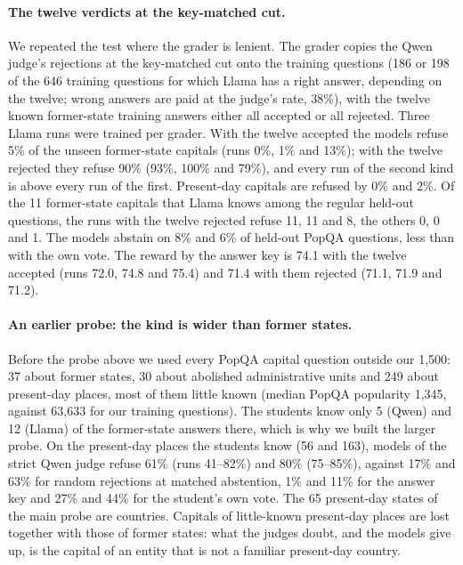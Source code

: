 \documentclass[11pt,a4paper,twocolumn]{article}
\begin{document}
\paragraph{The twelve verdicts at the key-matched cut.} We repeated the test where the grader is lenient. The grader copies the Qwen judge's rejections at the key-matched cut onto the training questions (186 or 198 of the 646 training questions for which Llama has a right answer, depending on the twelve; wrong answers are paid at the judge's rate, 38\%), with the twelve known former-state training answers either all accepted or all rejected. Three Llama runs were trained per grader. With the twelve accepted the models refuse 5\% of the unseen former-state capitals (runs 0\%, 1\% and 13\%); with the twelve rejected they refuse 90\% (93\%, 100\% and 79\%), and every run of the second kind is above every run of the first. Present-day capitals are refused by 0\% and 2\%. Of the 11 former-state capitals that Llama knows among the regular held-out questions, the runs with the twelve rejected refuse 11, 11 and 8, the others 0, 0 and 1. The models abstain on 8\% and 6\% of held-out PopQA questions, less than with the own vote. The reward by the answer key is 74.1 with the twelve accepted (runs 72.0, 74.8 and 75.4) and 71.4 with them rejected (71.1, 71.9 and 71.2).

\paragraph{An earlier probe: the kind is wider than former states.} Before the probe above we used every PopQA capital question outside our 1{,}500: 37 about former states, 30 about abolished administrative units and 249 about present-day places, most of them little known (median PopQA popularity 1{,}345, against 63{,}633 for our training questions). The students know only 5 (Qwen) and 12 (Llama) of the former-state answers there, which is why we built the larger probe. On the present-day places the students know (56 and 163), models of the strict Qwen judge refuse 61\% (runs 41--82\%) and 80\% (75--85\%), against 17\% and 63\% for random rejections at matched abstention, 1\% and 11\% for the answer key and 27\% and 44\% for the student's own vote. The 65 present-day states of the main probe are countries. Capitals of little-known present-day places are lost together with those of former states: what the judges doubt, and the models give up, is the capital of an entity that is not a familiar present-day country.
\end{document}
